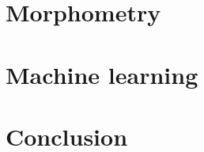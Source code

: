 \documentclass[12pt,a4paper]{report}
\begin{document}


\tableofcontents
\part{Morphometry}
	
	
	
	
\part{Machine learning}
	
	
	
	
	
	
	
	
	
\part{Conclusion}
	
		


\end{document}
